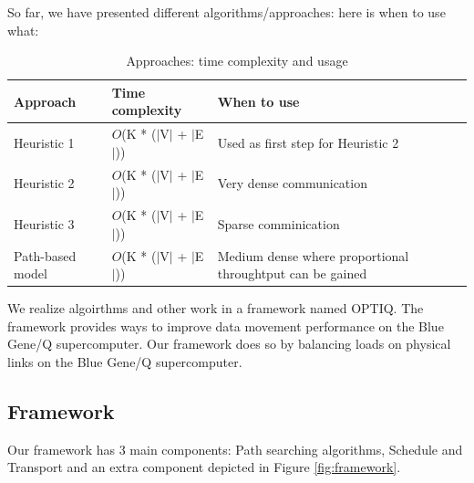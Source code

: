 So far, we have presented different algorithms/approaches: here is when to use what:

\begin{table}[h]
\begin{center}
    \begin{tabular}{ | p{1.6cm} | l | p{3cm} |}
    \hline
    Approach & Time complexity & When to use \\ \hline
    Heuristic 1 & $O$(K * ($|$V$|$ + $|$E$|$)) &  Used as first step for Heuristic 2\\ \hline
    Heuristic 2 & $O$(K * ($|$V$|$ + $|$E$|$)) &  Very dense communication\\ \hline
    Heuristic 3 & $O$(K * ($|$V$|$ + $|$E$|$)) & Sparse comminication \\ \hline
    Path-based model & $O$(K * ($|$V$|$ + $|$E$|$)) & Medium dense where proportional throughtput can be gained \\
    \hline
    \end{tabular}

    \caption{Approaches: time complexity and usage}
    \label{tbl:experiment}

\end{center}
\end{table}

We realize algoirthms and other work in a framework named OPTIQ. The framework provides ways to improve data movement performance on the Blue Gene/Q supercomputer. Our framework does so by balancing loads on physical links on the Blue Gene/Q supercomputer.

\subsection{Framework}

Our framework has 3 main components: Path searching algorithms, Schedule and Transport and an extra component depicted in Figure \ref{fig:framework}.

